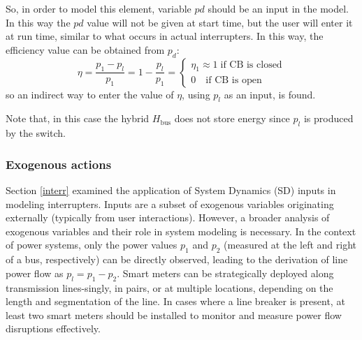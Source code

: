 \documentclass[energies,accept,oneauthor,pdftex]{Definitions/mdpi}
\begin{document}
So, in order to model this element, variable $ pd $ should be an input in the model. In this way the $ pd $ value will not be given at start time, but the user will enter it at run time, similar to what occurs in actual interrupters. In this way, the efficiency value can be obtained from $ p_d $:
\[
 \eta = \frac{p_1-p_l}{p_1} = 1- \frac{p_l}{p_1} =
\begin{cases}
 \eta_1 \approx 1\; \text{if CB is closed} \\
0 \quad \text{if CB is open}
\end{cases}
\]
so an indirect way to enter the value of $\eta$, using $ p_l $ as an input, is found.

Note that, in this case the hybrid $H_{\text{bus}}$ does not store energy since $p_l$ is produced by the switch.




\subsubsection{Exogenous actions}

Section \ref{interr} examined the application of System Dynamics (SD) inputs in modeling interrupters. Inputs are a subset of exogenous variables originating externally (typically from user interactions). However, a broader analysis of exogenous variables and their role in system modeling is necessary. In the context of power systems, only the power values $p_1$ and $p_2$ (measured at the left and right of a bus, respectively) can be directly observed, leading to the derivation of line power flow as $p_l=p_1-p_2$.
Smart meters can be strategically deployed along transmission lines-singly, in pairs, or at multiple locations, depending on the length and segmentation of the line. In cases where a line breaker is present, at least two smart meters should be installed to monitor and measure power flow disruptions effectively.
\end{document}
